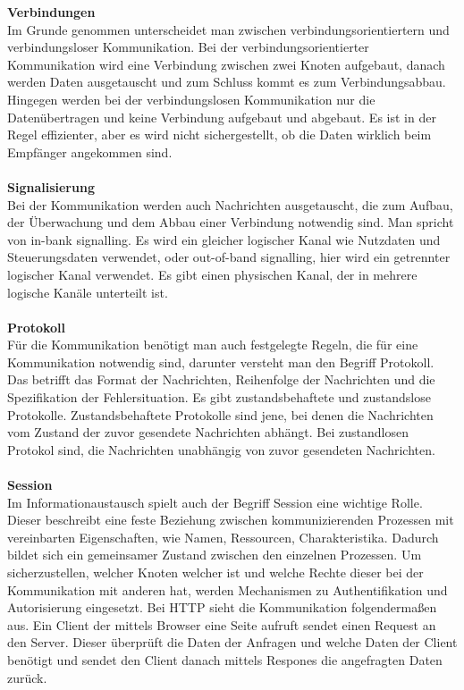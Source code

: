\documentclass[a4paper,12pt]{article}
\begin{document}
\newpage
\noindent
\textbf{Verbindungen\\}
Im Grunde genommen unterscheidet man zwischen verbindungsorientiertern und verbindungsloser Kommunikation. Bei der verbindungsorientierter Kommunikation wird eine Verbindung zwischen zwei Knoten aufgebaut, danach werden Daten ausgetauscht und zum Schluss kommt es zum
Verbindungsabbau. Hingegen werden bei der verbindungslosen Kommunikation nur die Datenübertragen und keine Verbindung aufgebaut und abgebaut. Es ist in der Regel effizienter, aber es wird nicht sichergestellt, ob die Daten wirklich beim Empfänger angekommen sind.\\ \\
\textbf{Signalisierung\\}
Bei der Kommunikation werden auch Nachrichten ausgetauscht, die zum Aufbau, der Überwachung und dem Abbau einer Verbindung notwendig sind. Man spricht von in-bank signalling. Es wird ein gleicher logischer Kanal wie Nutzdaten und Steuerungsdaten verwendet, oder out-of-band signalling, hier wird ein getrennter logischer Kanal verwendet. Es gibt einen
physischen Kanal, der in mehrere logische Kanäle unterteilt ist. \\ \\
\textbf{Protokoll\\}
Für die Kommunikation benötigt man auch festgelegte Regeln, die für eine Kommunikation notwendig sind, darunter versteht man den Begriff Protokoll. Das betrifft das Format der Nachrichten, Reihenfolge der Nachrichten und die Spezifikation der Fehlersituation. Es gibt zustandsbehaftete und zustandslose Protokolle. Zustandsbehaftete Protokolle sind jene, bei denen die Nachrichten
vom Zustand der zuvor gesendete Nachrichten abhängt. Bei zustandlosen Protokol sind, die Nachrichten unabhängig von zuvor gesendeten Nachrichten.\\\\
\textbf{Session\\}
Im Informationaustausch spielt auch der Begriff Session eine wichtige Rolle. Dieser beschreibt eine feste Beziehung zwischen kommunizierenden Prozessen mit vereinbarten Eigenschaften, wie Namen, Ressourcen, Charakteristika. Dadurch bildet sich ein gemeinsamer Zustand zwischen den einzelnen Prozessen. Um sicherzustellen, welcher Knoten welcher ist und welche Rechte dieser
bei der Kommunikation mit anderen hat, werden Mechanismen zu Authentifikation und Autorisierung eingesetzt. Bei HTTP sieht die Kommunikation folgendermaßen aus. Ein Client der mittels Browser eine Seite aufruft sendet einen Request an den Server. Dieser überprüft die Daten der Anfragen und welche Daten der Client benötigt und sendet den Client danach mittels Respones die angefragten Daten zurück.\\
\end{document}
